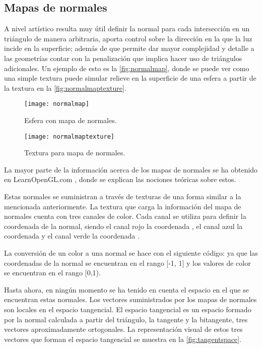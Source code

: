 \subsection{Mapas de normales}
		
A nivel artístico resulta muy útil definir la normal para cada intersección en un triángulo de manera arbitraria, aporta control sobre la dirección en la que la luz incide en la superficie; además de que permite dar mayor complejidad y detalle a las geometrías contar con la penalización que implica hacer uso de triángulos adicionales. Un ejemplo de esto es la \autoref{fig:normalmap}, donde se puede ver como una simple textura puede simular relieve en la superficie de una esfera a partir de la textura en la \autoref{fig:normalmaptexture}. 
	
		
\begin{figure}[H]
    \centering
	\texttt{[image: normalmap]}
	\caption{Esfera con mapa de normales.}
	\label{fig:normalmap}
\end{figure}

\begin{figure}[H]
    \centering
	\texttt{[image: normalmaptexture]}
	\caption{Textura para mapa de normales.}
	\label{fig:normalmaptexture}
\end{figure}


	
La mayor parte de la información acerca de los mapas de normales se ha obtenido en LearnOpenGL.com \cite{learnopengl}, donde se explican las nociones teóricas sobre estos.
	
Estas normales se suministran a través de texturas de una forma similar a la mencionada anteriormente. La textura que carga la información del mapa de normales cuenta con tres canales de color. Cada canal se utiliza para definir la coordenada de la normal, siendo el canal rojo la coordenada , el canal azul la coordenada  y el canal verde la coordenada .

La conversión de un color a una normal se hace con el siguiente código:  ya que las coordenadas de la normal se encuentran en el rango [-1, 1] y los valores de color se encuentran en el rango [0,1).
	
Hasta ahora, en ningún momento se ha tenido en cuenta el espacio en el que se encuentran estas normales. Los vectores suministrados por los mapas de normales son locales en el espacio tangencial. El espacio tangencial es un espacio formado por la normal calculada a partir del triángulo, la tangente y la bitangente, tres vectores aproximadamente ortogonales. La representación visual de estos tres vectores que forman el espacio tangencial se muestra en la \autoref{fig:tangentspace}.


